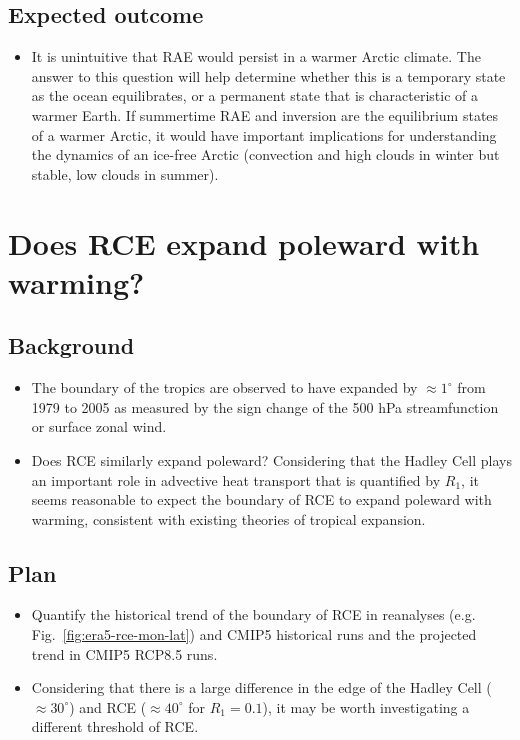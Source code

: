 \documentclass{article}
\begin{document}
\subsection{Expected outcome}
\begin{itemize}
	\item It is unintuitive that RAE would persist in a warmer Arctic climate. The answer to this question will help determine whether this is a temporary state as the ocean equilibrates, or a permanent state that is characteristic of a warmer Earth. If summertime RAE and inversion are the equilibrium states of a warmer Arctic, it would have important implications for understanding the dynamics of an ice-free Arctic (convection and high clouds in winter but stable, low clouds in summer).
\end{itemize}

\section{Does RCE expand poleward with warming?}
\subsection{Background}
\begin{itemize}
	\item The boundary of the tropics are observed to have expanded by $\approx 1^\circ$ from 1979 to 2005 as measured by the sign change of the 500 hPa streamfunction or surface zonal wind.
	\item Does RCE similarly expand poleward? Considering that the Hadley Cell plays an important role in advective heat transport that is quantified by $R_1$, it seems reasonable to expect the boundary of RCE to expand poleward with warming, consistent with existing theories of tropical expansion.
\end{itemize}
\subsection{Plan}
\begin{itemize}
	\item Quantify the historical trend of the boundary of RCE in reanalyses (e.g. Fig.~\ref{fig:era5-rce-mon-lat}) and CMIP5 historical runs and the projected trend in CMIP5 RCP8.5 runs.
	\item Considering that there is a large difference in the edge of the Hadley Cell ($\approx 30^\circ$) and RCE ($\approx 40^\circ$ for $R_1=0.1$), it may be worth investigating a different threshold of RCE.
\end{itemize}
\end{document}
